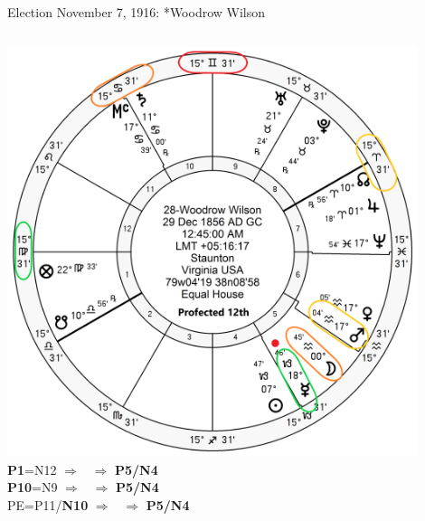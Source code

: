 \begin{frame}[t]{Election November 7, 1916: *Woodrow Wilson}
\begin{columns}[T, onlytextwidth]
\vspace{-1em}
{\includegraphics[width=0.9\textwidth]{charts/Wilson-Prof-12th.png}}
\textbf{\dgreen P1}=N12
	$\Rightarrow$ \Mercury\, $\Rightarrow$ \textbf{\dgreen P5/N4} \\
\textbf{\red P10}=N9
	$\Rightarrow$  \Mercury\, $\Rightarrow$ \textbf{\dgreen P5/N4} \\
PE=P11/\textbf{\red N10}
	$\Rightarrow$  \Moon\, $\Rightarrow$   \textbf{\dgreen P5/N4}

\end{columns}
\end{frame}

